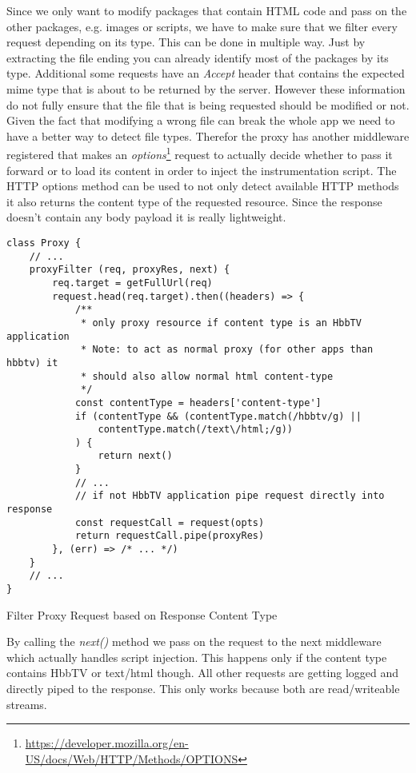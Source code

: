 Since we only want to modify packages that contain HTML code and pass on the other packages, e.g. images
or scripts, we have to make sure that we filter every request depending on its type. This can be done in
multiple way. Just by extracting the file ending you can already identify most of the packages by its
type. Additional some requests have an \textit{Accept} header that contains the expected mime type that
is about to be returned by the server. However these information do not fully ensure that the file that
is being requested should be modified or not. Given the fact that modifying a wrong file can break the
whole app we need to have a better way to detect file types. Therefor the proxy has another middleware
registered that makes an \textit{options}\footnote{\url{https://developer.mozilla.org/en-US/docs/Web/HTTP/Methods/OPTIONS}}
request to actually decide whether to pass it forward or to load its content in order to inject the
instrumentation script. The HTTP options method can be used to not only detect available HTTP methods
it also returns the content type of the requested resource. Since the response doesn't contain any body
payload it is really lightweight.

\begin{listing}[H]
\begin{verbatim}
class Proxy {
    // ...
    proxyFilter (req, proxyRes, next) {
        req.target = getFullUrl(req)
        request.head(req.target).then((headers) => {
            /**
             * only proxy resource if content type is an HbbTV application
             * Note: to act as normal proxy (for other apps than hbbtv) it
             * should also allow normal html content-type
             */
            const contentType = headers['content-type']
            if (contentType && (contentType.match(/hbbtv/g) ||
                contentType.match(/text\/html;/g))
            ) {
                return next()
            }
            // ...
            // if not HbbTV application pipe request directly into response
            const requestCall = request(opts)
            return requestCall.pipe(proxyRes)
        }, (err) => /* ... */)
    }
    // ...
}
\end{verbatim}
\caption{Filter Proxy Request based on Response Content Type}
\label{lst:proxyFilter}
\end{listing}

By calling the \textit{next()} method we pass on the request to the next middleware which actually handles
script injection. This happens only if the content type contains HbbTV or text/html though. All other
requests are getting logged and directly piped to the response. This only works because both are read/writeable
streams.

